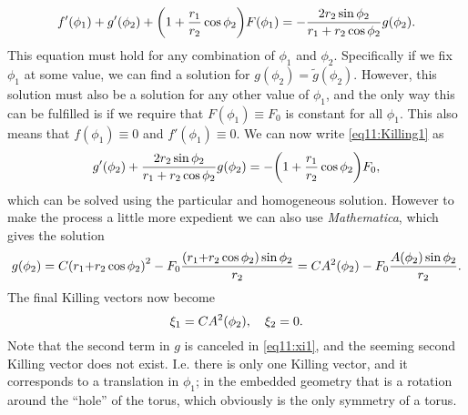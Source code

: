 \documentclass[11pt,a4paper, 
swedish, english %
]{article}
\begin{document}
\begin{equation}\label{eq11:Killing1}
f'(\phi_1)+g'(\phi_2)+\qty(1+\frac{r_1}{r_2}\cos\phi_2)F(\phi_1)
=-\frac{2r_2\sin\phi_2}{r_1+r_2\cos\phi_2}g(\phi_2).
\end{equation}
This equation must hold for any combination of $\phi_1$ and
$\phi_2$. Specifically if we fix $\phi_1$ at some value, we can
find a solution for $g(\phi_2)=\tilde{g}(\phi_2)$. However, this
solution must also be a solution for any other value of $\phi_1$, and
the only way this can be fulfilled is if we require that
$F(\phi_1)\equiv F_0$ is constant for all $\phi_1$. This also means
that $f(\phi_1)\equiv0$ and $f'(\phi_1)\equiv0$. We can now write
\eqref{eq11:Killing1} as
\begin{equation}
g'(\phi_2)+\frac{2r_2\sin\phi_2}{r_1+r_2\cos\phi_2}g(\phi_2)
=-\qty(1+\frac{r_1}{r_2}\cos\phi_2)F_0,
\end{equation}
which can be solved using the particular and homogeneous
solution. However to make the process a little more expedient we can
also use \textsl{Mathematica}, which gives the solution
\begin{equation}
g(\phi_2)=C\qty(r_1{+}r_2\cos\phi_2)^2
-F_0\frac{(r_1{+}r_2\cos\phi_2)\sin\phi_2}{r_2}
=CA^2(\phi_2)-F_0\frac{A(\phi_2)\sin\phi_2}{r_2}.
\end{equation}
The final Killing vectors now become
\begin{equation}
\xi_1=CA^2(\phi_2)\qc
\xi_2=0.
\end{equation}
Note that the second term in $g$ is canceled in \eqref{eq11:xi1}, and
the seeming second Killing vector does not exist. I.e. there is only
one Killing vector, and it corresponds to a translation in $\phi_1$;
in the embedded geometry that is a rotation around the ``hole'' of 
the torus, which obviously is the only symmetry of a torus.
\end{document}
